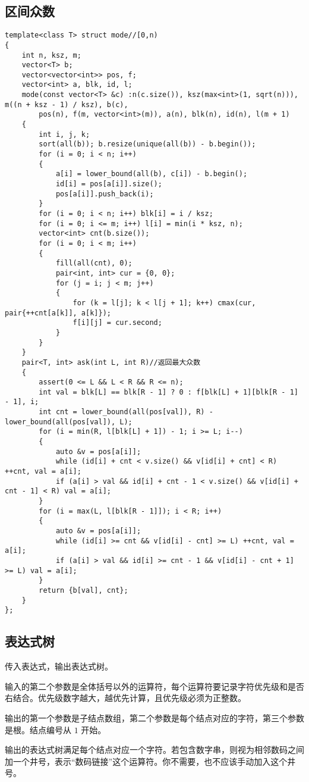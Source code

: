 \documentclass[12pt]{ctexart}
\begin{document}
\subsection{区间众数}

\begin{lstlisting}
template<class T> struct mode//[0,n)
{
	int n, ksz, m;
	vector<T> b;
	vector<vector<int>> pos, f;
	vector<int> a, blk, id, l;
	mode(const vector<T> &c) :n(c.size()), ksz(max<int>(1, sqrt(n))), m((n + ksz - 1) / ksz), b(c),
		pos(n), f(m, vector<int>(m)), a(n), blk(n), id(n), l(m + 1)
	{
		int i, j, k;
		sort(all(b)); b.resize(unique(all(b)) - b.begin());
		for (i = 0; i < n; i++)
		{
			a[i] = lower_bound(all(b), c[i]) - b.begin();
			id[i] = pos[a[i]].size();
			pos[a[i]].push_back(i);
		}
		for (i = 0; i < n; i++) blk[i] = i / ksz;
		for (i = 0; i <= m; i++) l[i] = min(i * ksz, n);
		vector<int> cnt(b.size());
		for (i = 0; i < m; i++)
		{
			fill(all(cnt), 0);
			pair<int, int> cur = {0, 0};
			for (j = i; j < m; j++)
			{
				for (k = l[j]; k < l[j + 1]; k++) cmax(cur, pair{++cnt[a[k]], a[k]});
				f[i][j] = cur.second;
			}
		}
	}
	pair<T, int> ask(int L, int R)//返回最大众数
	{
		assert(0 <= L && L < R && R <= n);
		int val = blk[L] == blk[R - 1] ? 0 : f[blk[L] + 1][blk[R - 1] - 1], i;
		int cnt = lower_bound(all(pos[val]), R) - lower_bound(all(pos[val]), L);
		for (i = min(R, l[blk[L] + 1]) - 1; i >= L; i--)
		{
			auto &v = pos[a[i]];
			while (id[i] + cnt < v.size() && v[id[i] + cnt] < R) ++cnt, val = a[i];
			if (a[i] > val && id[i] + cnt - 1 < v.size() && v[id[i] + cnt - 1] < R) val = a[i];
		}
		for (i = max(L, l[blk[R - 1]]); i < R; i++)
		{
			auto &v = pos[a[i]];
			while (id[i] >= cnt && v[id[i] - cnt] >= L) ++cnt, val = a[i];
			if (a[i] > val && id[i] >= cnt - 1 && v[id[i] - cnt + 1] >= L) val = a[i];
		}
		return {b[val], cnt};
	}
};
\end{lstlisting}

\subsection{表达式树}

传入表达式，输出表达式树。

输入的第二个参数是全体括号以外的运算符，每个运算符要记录字符优先级和是否右结合。优先级数字越大，越优先计算，且优先级必须为正整数。

输出的第一个参数是子结点数组，第二个参数是每个结点对应的字符，第三个参数是根。结点编号从 $1$ 开始。

输出的表达式树满足每个结点对应一个字符。若包含数字串，则视为相邻数码之间加一个井号，表示“数码链接”这个运算符。你不需要，也不应该手动加入这个井号。
\end{document}
